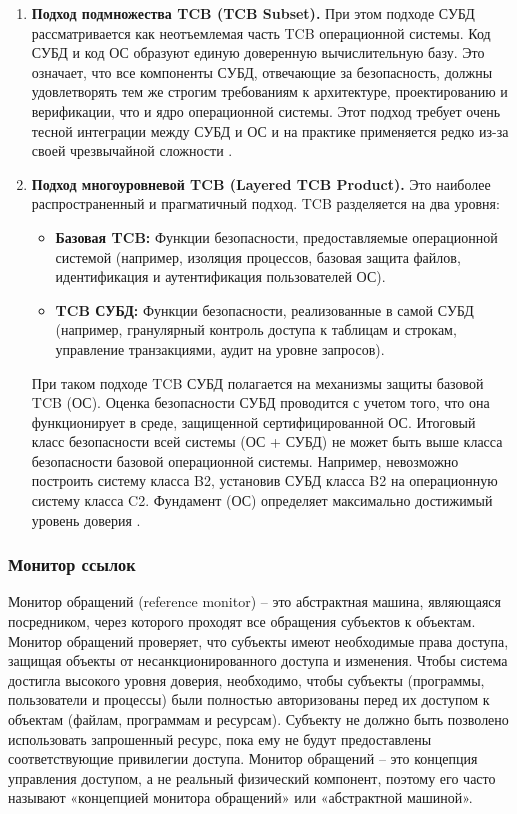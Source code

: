 \begin{enumerate}
	\item \textbf{Подход подмножества TCB (TCB Subset).} При этом подходе СУБД рассматривается как неотъемлемая часть TCB операционной системы. Код СУБД и код ОС образуют единую доверенную вычислительную базу. Это означает, что все компоненты СУБД, отвечающие за безопасность, должны удовлетворять тем же строгим требованиям к архитектуре, проектированию и верификации, что и ядро операционной системы. Этот подход требует очень тесной интеграции между СУБД и ОС и на практике применяется редко из-за своей чрезвычайной сложности \cite[Appendix B]{PurpleBook}.
	\item \textbf{Подход многоуровневой TCB (Layered TCB Product).} Это наиболее распространенный и прагматичный подход. TCB разделяется на два уровня:
	\begin{itemize}
		\item \textbf{Базовая TCB:} Функции безопасности, предоставляемые операционной системой (например, изоляция процессов, базовая защита файлов, идентификация и аутентификация пользователей ОС).
		\item \textbf{TCB СУБД:} Функции безопасности, реализованные в самой СУБД (например, гранулярный контроль доступа к таблицам и строкам, управление транзакциями, аудит на уровне запросов).
	\end{itemize}
	При таком подходе TCB СУБД полагается на механизмы защиты базовой TCB (ОС). Оценка безопасности СУБД проводится с учетом того, что она функционирует в среде, защищенной сертифицированной ОС. Итоговый класс безопасности всей системы (ОС + СУБД) не может быть выше класса безопасности базовой операционной системы. Например, невозможно построить систему класса B2, установив СУБД класса B2 на операционную систему класса C2. Фундамент (ОС) определяет максимально достижимый уровень доверия \cite[Appendix B]{PurpleBook}.
\end{enumerate}

\subsubsection{Монитор ссылок}
Монитор обращений (reference monitor) – это абстрактная машина, являющаяся посредником, через которого проходят все обращения субъектов к объектам. Монитор обращений проверяет, что субъекты имеют необходимые права доступа, защищая объекты от несанкционированного доступа и изменения.
Чтобы система достигла высокого уровня доверия, необходимо, чтобы субъекты (программы, пользователи и процессы) были полностью авторизованы перед их доступом к объектам (файлам, программам и ресурсам).
Субъекту не должно быть позволено использовать запрошенный ресурс, пока ему не будут предоставлены соответствующие привилегии доступа. Монитор обращений – это концепция управления доступом, а не реальный физический компонент, поэтому его часто называют «концепцией монитора обращений» или «абстрактной машиной». \cite{CISSP}

